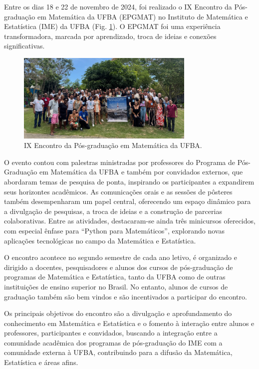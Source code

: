 \documentclass{hipatia}
\begin{document}
Entre os dias 18 e 22 de novembro de 2024, foi realizado o IX Encontro da Pós-graduação em Matemática da UFBA (EPGMAT) no Instituto de Matemática e Estatística (IME) da UFBA (Fig. \ref{epgmat}). O EPGMAT foi uma experiência transformadora, marcada por aprendizado, troca de ideias e conexões significativas. 

\begin{figure}[htb]
    \centering
    \includegraphics[width=8.5cm]{9epgmat.jpg}
    \caption{IX Encontro da Pós-graduação em Matemática da UFBA.}
 \label{epgmat}
\end{figure}

O evento contou com palestras ministradas por professores do Programa de Pós-Graduação em Matemática da UFBA e também por convidados externos, que abordaram temas de pesquisa de ponta, inspirando os participantes a expandirem seus horizontes acadêmicos. As comunicações orais e as sessões de pôsteres também desempenharam um papel central, oferecendo um espaço dinâmico para a divulgação de pesquisas, a troca de ideias e a construção de parcerias colaborativas. Entre as atividades, destacaram-se ainda três minicursos oferecidos, com especial ênfase para ``Python para Matemáticos'', explorando novas aplicações tecnológicas no campo da Matemática e Estatística. 



O encontro acontece no segundo semestre de cada ano letivo, é organizado e dirigido a docentes, pesquisadores e alunos dos cursos de pós-graduação de programas de Matemática e Estatística, tanto da UFBA como de outras instituições de ensino superior no Brasil. 
No entanto, alunos de cursos de graduação também são bem vindos e são incentivados a participar do encontro.


Os principais objetivos do encontro são a divulgação e aprofundamento do conhecimento em Matemática e Estatística e o fomento à interação entre alunos e professores, participantes e convidados, buscando a integração entre a comunidade acadêmica dos programas de pós-graduação do IME com a comunidade externa à UFBA, contribuindo para a difusão da Matemática, Estatística e áreas afins.
\end{document}
